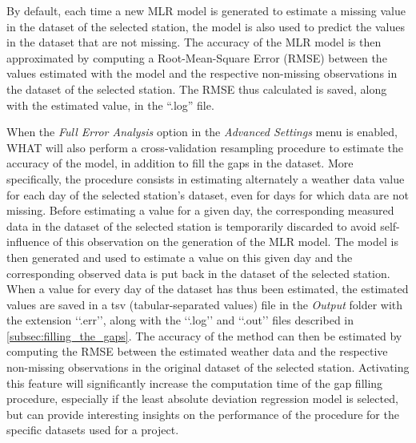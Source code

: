 \documentclass[WHATMANUAL.tex]{subfiles}
\begin{document}
By default, each time a new MLR model is generated to estimate a missing value in the dataset of the selected station, the model is also used to predict the values in the dataset that are not missing. The accuracy of the MLR model is then approximated by computing a Root-Mean-Square Error (RMSE) between the values estimated with the model and the respective non-missing observations in the dataset of the selected station. The RMSE thus calculated is saved, along with the estimated value, in the ``.log'' file.

When the \emph{Full Error Analysis} option in the \emph{Advanced Settings} menu is enabled, WHAT will also perform a cross-validation resampling procedure to estimate the accuracy of the model, in addition to fill the gaps in the dataset. More specifically, the procedure consists in estimating alternately a weather data value for each day of the selected station's dataset, even for days for which data are not missing. Before estimating a value for a given day, the corresponding measured data in the dataset of the selected station is temporarily discarded to avoid self-influence of this observation on the generation of the MLR model. The model is then generated and used to estimate a value on this given day and the corresponding observed data is put back in the dataset of the selected station. When a value for every day of the dataset has thus been estimated, the estimated values are saved in a tsv (tabular-separated values) file in the \emph{Output} folder with the extension ‘‘.err’’, along with the ‘‘.log’’ and ‘‘.out’’ files described in \cref{subsec:filling_the_gaps}. The accuracy of the method can then be estimated by computing the RMSE between the estimated weather data and the respective non-missing observations in the original dataset of the selected station. Activating this feature will significantly increase the computation time of the gap filling procedure, especially if the least absolute deviation regression model is selected, but can provide interesting insights on the performance of the procedure for the specific datasets used for a project.
\end{document}
